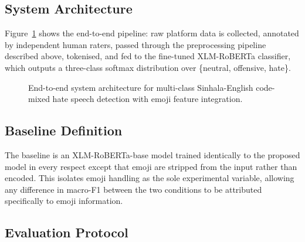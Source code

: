 \documentclass[journal]{IEEEtran}
\begin{document}
\subsection{System Architecture}

Figure~\ref{fig:architecture} shows the end-to-end pipeline: raw
platform data is collected, annotated by independent human raters,
passed through the preprocessing pipeline described above, tokenised,
and fed to the fine-tuned XLM-RoBERTa classifier, which outputs a
three-class softmax distribution over \{neutral, offensive, hate\}.

\begin{figure}[h]
\centering
\caption{End-to-end system architecture for multi-class Sinhala-English
code-mixed hate speech detection with emoji feature integration.}
\label{fig:architecture}
\end{figure}

\subsection{Baseline Definition}

The baseline is an XLM-RoBERTa-base model trained identically to the
proposed model in every respect except that emoji are stripped from the
input rather than encoded. This isolates emoji handling as the sole
experimental variable, allowing any difference in macro-F1 between the
two conditions to be attributed specifically to emoji information.

\subsection{Evaluation Protocol}
\end{document}
